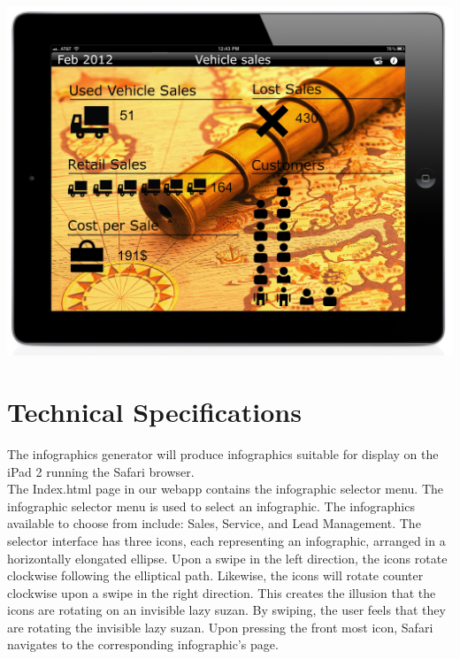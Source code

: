 \documentclass[11pt,a4paper,oneside]{article}
\begin{document}
\includegraphics[width=1\textwidth]{images/screen4.jpg}\\

\section{Technical Specifications}

The infographics generator will produce infographics suitable for display on the iPad 2 running the Safari browser.\\

The Index.html page in our webapp contains the infographic selector menu.  The infographic selector menu is used to select an infographic.  The infographics available to choose from include: Sales, Service, and Lead Management.  The selector interface has three icons, each representing an infographic, arranged in a horizontally elongated ellipse.  Upon a swipe in the left direction, the icons rotate clockwise following the elliptical path.  Likewise, the icons will rotate counter clockwise upon a swipe in the right direction.  This creates the illusion that the icons are rotating on an invisible lazy suzan. By swiping, the user feels that they are rotating the invisible lazy suzan.  Upon pressing the front most icon, Safari navigates to the corresponding infographic's page.\\
\end{document}
